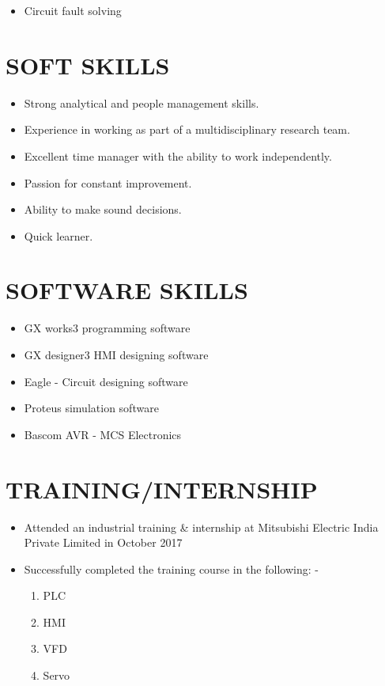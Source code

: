 \documentclass{res}
\begin{document}
\begin{resume}
\begin{itemize}
\item Circuit fault solving
\end{itemize}   

\section{SOFT SKILLS}          
    \begin{itemize} \itemsep -2pt  %
\item Strong analytical and people management skills. 
\item Experience in working as part of a multidisciplinary research team.
\item Excellent time manager with the ability to work independently.
\item Passion for constant improvement.
\item Ability to make sound decisions.
\item Quick learner.

 \end{itemize}

\section{SOFTWARE SKILLS}
\begin{itemize}\itemsep -2pt
\item GX works3 programming software
\item GX designer3 HMI designing software
\item Eagle - Circuit designing software
\item Proteus simulation software
\item Bascom AVR - MCS Electronics
\end{itemize} 

\section{TRAINING/INTERNSHIP}          
     \begin{itemize} \itemsep -2pt  %
 \item Attended an industrial training \& internship at Mitsubishi Electric India Private Limited in October 2017             
 \item Successfully completed the training course in the following: -
\begin{enumerate}
\item PLC
\item HMI
\item VFD
\item Servo                
\end{enumerate}
\end{itemize}


\end{resume}
\end{document}
